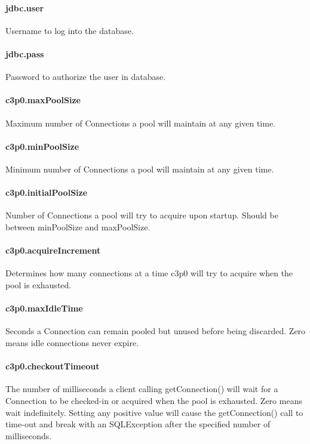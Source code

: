 \documentclass[12pt,a4paper]{report}
\begin{document}
\paragraph{jdbc.user}
Username to log into the database.
\paragraph{jdbc.pass}
Password to authorize the user in database.

\paragraph{c3p0.maxPoolSize}
Maximum number of Connections a pool will maintain at any given time.

\paragraph{c3p0.minPoolSize}
Minimum number of Connections a pool will maintain at any given time.

\paragraph{c3p0.initialPoolSize}
Number of Connections a pool will try to acquire upon startup. Should be between
minPoolSize and maxPoolSize.

\paragraph{c3p0.acquireIncrement}
Determines how many connections at a time c3p0 will try to acquire when the pool
is exhausted.

\paragraph{c3p0.maxIdleTime}
Seconds a Connection can remain pooled but unused before being discarded. Zero
means idle connections never expire.

\paragraph{c3p0.checkoutTimeout}
The number of milliseconds a client calling getConnection() will wait for a Connection
to be checked-in or acquired when the pool is exhausted. Zero means wait indefinitely.
Setting any positive value will cause the getConnection() call to time-out and
break with an SQLException after the specified number of milliseconds.
\end{document}
